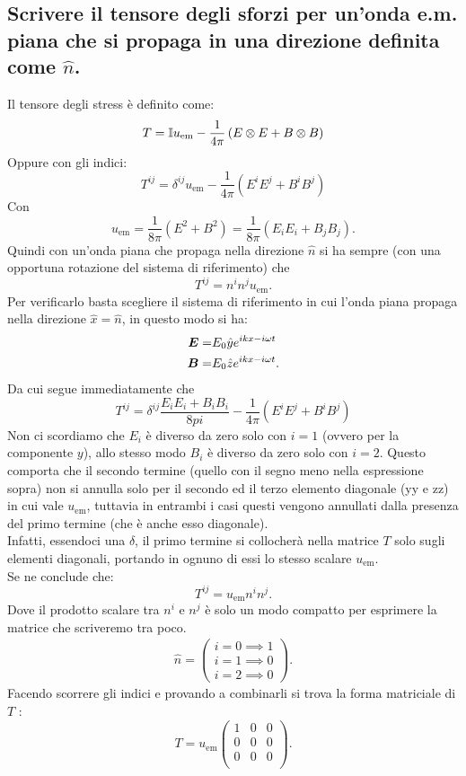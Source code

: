 \subsection[]{Scrivere il tensore degli sforzi per un’onda e.m. piana che si propaga in una direzione definita come $\hat{n}$.}
\label{sec:3.b.11}
Il tensore degli stress è definito come:
\[
	T= \mathbb{I} u_{\text{em}} - \frac{1}{4\pi} \left( E \otimes E + B \otimes B\right) 
\]
Oppure con gli indici:
\[
	T^{ij}= \delta^{ij}u_{\text{em}} - \frac{1}{4\pi}\left( E^{i}E^{j}+ B^{i}B^{j} \right) 
\]
Con 
\[
	u_{\text{em}}=\frac{1}{8\pi}\left( E^2 + B^2 \right) = \frac{1}{8\pi}\left( E_{i}E_{i}+ B_{j}B_{j} \right)
.\]
Quindi con un'onda piana che propaga nella direzione $\hat{n}$ si ha sempre (con una opportuna rotazione del sistema di riferimento) che \[
	T^{ij}=n^{i}n^{j}u_{\text{em}}
.\] 
Per verificarlo basta scegliere il sistema di riferimento in cui l'onda piana propaga nella direzione $\hat{x}=\hat{n}$, in questo modo si ha:
\begin{align*}
	\boldsymbol{E}=&E_0 \hat{y} e^{ikx-i \omega t}\\
	\boldsymbol{B}=&E_0 \hat{z} e^{ikx-i\omega t}
.\end{align*}
Da cui segue immediatamente che \[
	T^{ij}= \delta^{ij} \frac{E_{i}E_{i}+B_{i}B_{i}}{8 pi} - \frac{1}{4\pi}\left(  E^{i}E^{j}+B^{i}B^{j}\right)
\]
Non ci scordiamo che $E_i$ è diverso da zero solo con $i=1$ (ovvero per la componente $y$), allo stesso modo  $B_i$ è diverso da zero solo con $i=2$. Questo comporta che il secondo termine (quello con il segno meno nella espressione sopra) non si annulla solo per il secondo ed il terzo elemento diagonale (yy e zz) in cui vale $u_{\text{em}}$, tuttavia in entrambi i casi questi vengono annullati dalla presenza del primo termine (che è anche esso diagonale).\\
Infatti, essendoci una $\delta$, il primo termine si collocherà nella matrice $T$ solo sugli elementi diagonali, portando in ognuno di essi lo stesso scalare $u_{\text{em}}$. \\
Se ne conclude che:
\[
	T^{ij}=  u_{\text{em}}n^{i}n^{j}
.\] 
Dove il prodotto scalare tra $n^{i}$ e $n^{j}$ è solo un modo compatto per esprimere la matrice che scriveremo tra poco.
\begin{align*}
	\hat{n}=
	\left( 
	\begin{array}{c}
		i=0 \implies 1\\
		i=1 \implies 0\\
		i=2 \implies 0
	\end{array}
	\right) 
.\end{align*}
Facendo scorrere gli indici e provando a combinarli si trova la forma matriciale di $T$ :
\[
	T=
	u_{\text{em}}
	\left(
	\begin{array}{ccc}
		1 & 0 & 0 \\   
		0 & 0 & 0 \\
		0 & 0 & 0 \\
	\end{array}
	\right)
.\] 
